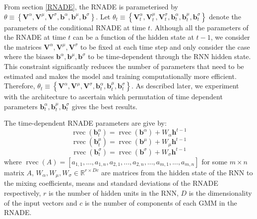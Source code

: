 \documentclass{article} %
\DeclareMathOperator{\rvec}{rvec}
\begin{document}
From section \ref{RNADE}, the RNADE is parameterised by $ \theta \equiv \left\{ \mathbf{V}^{\alpha},\mathbf{V}^{\mu},\mathbf{V}^{\sigma},\mathbf{b}^{\alpha},\mathbf{b}^{\mu},\mathbf{b}^{\sigma} \right\}$. Let  $ \theta_t \equiv \left\{ \mathbf{V}^{\alpha}_{t},\mathbf{V}^{\mu}_{t},\mathbf{V}^{\sigma}_{t},\mathbf{b}^{\alpha}_{t},\mathbf{b}^{\mu}_{t},\mathbf{b}^{\sigma}_{t} \right\}$ denote the parameters of the conditional RNADE at time $t$. Although all the parameters of the RNADE at time $t$ can be a function of the hidden state at $t-1$, we consider the matrices $ \mathbf{V}^{\alpha},\mathbf{V}^{\mu},\mathbf{V}^{\sigma}$ to be fixed at each time step and only consider the case where the biases $\mathbf{b}^{\alpha},\mathbf{b}^{\mu},\mathbf{b}^{\sigma}$ to be time-dependent through the RNN hidden state. This constraint significantly reduces the number of parameters that need to be estimated and makes the model and training computationally more efficient. 
Therefore, $ \theta_t \equiv \left\{ \mathbf{V}^{\alpha},\mathbf{V}^{\mu},\mathbf{V}^{\sigma},\mathbf{b}^{\alpha}_{t},\mathbf{b}^{\mu}_{t},\mathbf{b}^{\sigma}_{t} \right\}$. As described later, we experiment with the architecture to ascertain which permutation of time dependent parameters $\mathbf{b}^{\alpha}_{t},\mathbf{b}^{\mu}_{t},\mathbf{b}^{\sigma}_{t}$ gives the best results.  

The time-dependent RNADE parameters are give by:
\begin{equation}
\label{one}
\rvec(\mathbf{b}^{\alpha}_{t}) = \rvec(\mathbf{b}^{\alpha}) + W_{\alpha}\mathbf{h}^{t-1}
\end{equation}
\begin{equation}
\label{two}
\rvec(\mathbf{b}^{\mu}_{t}) = \rvec(\mathbf{b}^{\mu}) + W_{\mu}\mathbf{h}^{t-1}
\end{equation}
\begin{equation}
\label{three}
\rvec(\mathbf{b}^{\sigma}_{t}) = \rvec(\mathbf{b}^{\sigma}) + W_{\sigma}\mathbf{h}^{t-1}
\end{equation}
where $\rvec(A) = [a_{1,1}, ..., a_{1,n}, a_{2,1}, ..., a_{2,n}, ..., a_{m,1}, ..., a_{m,n}]$ for some $m \times n$ matrix $A$, $W_{\alpha},W_{\mu},W_{\sigma} \in \mathbb{R}^{r \times D c}$ are matrices from the hidden state of the RNN to the mixing coefficients, means and standard deviations of the RNADE respectively, $r$ is the number of hidden units in the RNN, $D$ is the dimensionality of the input vectors and $c$ is the number of components of each GMM in the RNADE. 

\end{document}

